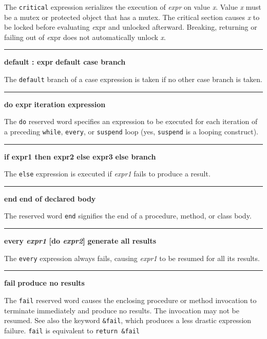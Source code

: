 \noindent
{}The \texttt{critical} expression serializes the
execution of \textit{expr} on value {\textit x}. Value {\textit x} must
be a mutex or protected object that has a mutex. The critical section
causes {\textit x} to be locked before evaluating {\textit expr} and
unlocked afterward. Breaking, returning or failing out of {\textit expr} 
does not automatically unlock {\textit x}.\WarningNotThreadSafe

\bigskip\hrule\vspace{0.1cm}
\noindent
{\bf default : expr } \hfill {\bf default case branch}

\noindent
{}The \texttt{default} branch of a case
expression is taken if no other case branch is taken.

\bigskip\hrule\vspace{0.1cm}
\noindent
{\bf do expr } \hfill {\bf iteration expression}

\noindent
{}The \texttt{do} reserved word specifies an
expression to be executed for each iteration of a preceding
\texttt{while}, \texttt{every}, or \texttt{suspend} loop (yes,
\texttt{suspend} is a looping construct).

\bigskip\hrule\vspace{0.1cm}
\noindent
{\bf if expr1 then expr2 else expr3 } \hfill {\bf else branch}

\noindent
{}The \texttt{else} expression is executed if \textit{expr1}
fails to produce a result.

\bigskip\hrule\vspace{0.1cm}
\noindent
{\bf end } \hfill {\bf end of declared body}

\noindent
{}The reserved word \texttt{end} signifies the end of a
procedure, method, or class body.

\bigskip\hrule\vspace{0.1cm}
\noindent
{\bf \textbf{every} \textit{expr1} [do \textit{expr2}] } \hfill {\bf generate all results}

\noindent
{}The \texttt{every} expression always fails, causing
\textit{expr1} to be resumed for all its results.

\bigskip\hrule\vspace{0.1cm}
\noindent
{\bf fail } \hfill {\bf produce no results}

\noindent
{}The \texttt{fail} reserved word causes the enclosing
procedure or method invocation to terminate immediately and produce no
results. The invocation may not be resumed. See also the keyword
\texttt{\&fail}, which produces a less drastic expression failure.
\texttt{fail} is equivalent to \texttt{return \&fail}

